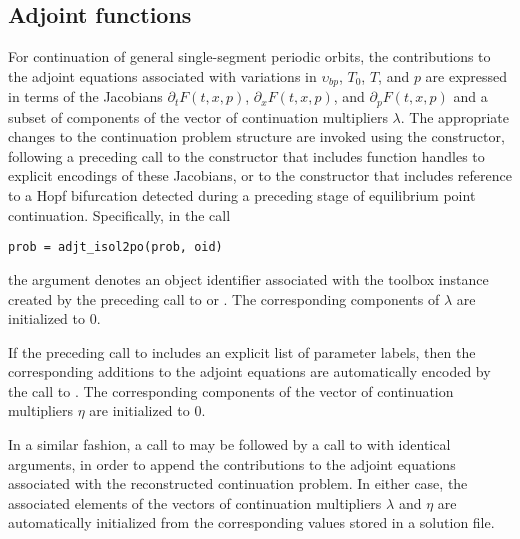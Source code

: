 \subsection{Adjoint functions}
For continuation of general single-segment periodic orbits, the contributions to the adjoint equations associated with variations in $\upsilon_{bp}$, $T_0$, $T$, and $p$ are expressed in terms of the Jacobians $\partial_t F(t,x,p)$, $\partial_x F(t,x,p)$, and $\partial_p F(t,x,p)$ and a subset of components of the vector of continuation multipliers $\lambda$. The appropriate changes to the continuation problem structure are invoked using the  constructor, following a preceding call to the  constructor that includes function handles to explicit encodings of these Jacobians, or to the  constructor that includes reference to a Hopf bifurcation detected during a preceding stage of equilibrium point continuation. Specifically, in the call
\begin{lstlisting}[language=coco-highlight]
prob = adjt_isol2po(prob, oid)
\end{lstlisting}
the  argument denotes an object identifier associated with the toolbox instance created by the preceding call to  or . The corresponding components of $\lambda$ are initialized to $0$.

If the preceding call to  includes an explicit list of parameter labels, then the corresponding additions to the adjoint equations are automatically encoded by the call to . The corresponding components of the vector of continuation multipliers $\eta$ are initialized to $0$.

In a similar fashion, a call to  may be followed by a call to  with identical arguments, in order to append the contributions to the adjoint equations associated with the reconstructed continuation problem. In either case, the associated elements of the vectors of continuation multipliers $\lambda$ and $\eta$ are automatically initialized from the corresponding values stored in a solution file.

